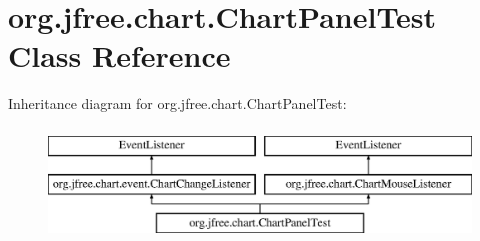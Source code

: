 \hypertarget{classorg_1_1jfree_1_1chart_1_1_chart_panel_test}{}\section{org.\+jfree.\+chart.\+Chart\+Panel\+Test Class Reference}
\label{classorg_1_1jfree_1_1chart_1_1_chart_panel_test}
Inheritance diagram for org.\+jfree.\+chart.\+Chart\+Panel\+Test\+:\begin{figure}[H]
\begin{center}
\leavevmode
\includegraphics[height=3.000000cm]{classorg_1_1jfree_1_1chart_1_1_chart_panel_test}
\end{center}
\end{figure}
